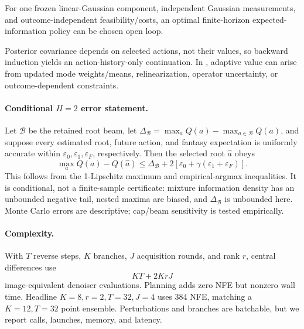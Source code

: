 \begin{proposition}
For one frozen linear-Gaussian component, independent Gaussian measurements,
and outcome-independent feasibility/costs, an optimal finite-horizon
expected-information policy can be chosen open loop.
\end{proposition}
\noindent
Posterior covariance depends on selected actions, not their values, so
backward induction yields an action-history-only continuation.  In \method{},
adaptive value can arise from updated mode weights/means, relinearization,
operator uncertainty, or outcome-dependent constraints.

\paragraph{Conditional $H=2$ error statement.}
Let $\mathcal B$ be the retained root beam, let
$\Delta_{\mathcal B}=\max_aQ(a)-\max_{a\in\mathcal B}Q(a)$, and suppose every
estimated root, future action, and fantasy expectation is uniformly accurate
within $\varepsilon_0,\varepsilon_1,\varepsilon_F$, respectively.  Then the
selected root $\widehat a$ obeys
\begin{equation}
 \max_aQ(a)-Q(\widehat a)
 \leq\Delta_{\mathcal B}
 +2[\varepsilon_0+\gamma(\varepsilon_1+\varepsilon_F)].
 \label{eq:regret}
\end{equation}
This follows from the 1-Lipschitz maximum and empirical-argmax inequalities.
It is conditional, not a finite-sample certificate: mixture information
density has an unbounded negative tail, nested maxima are biased, and
$\Delta_{\mathcal B}$ is unbounded here.  Monte Carlo errors are descriptive;
cap/beam sensitivity is tested empirically.

\paragraph{Complexity.}
With $T$ reverse steps, $K$ branches, $J$ acquisition rounds, and rank $r$,
central differences use
\begin{equation}
    KT+2KrJ
    \label{eq:nfe}
\end{equation}
image-equivalent denoiser evaluations.  Planning adds zero NFE but nonzero
wall time.  Headline $K=8,r=2,T=32,J=4$ uses 384 NFE, matching a
$K=12,T=32$ point ensemble.  Perturbations and branches are batchable, but we
report calls, launches, memory, and latency.
